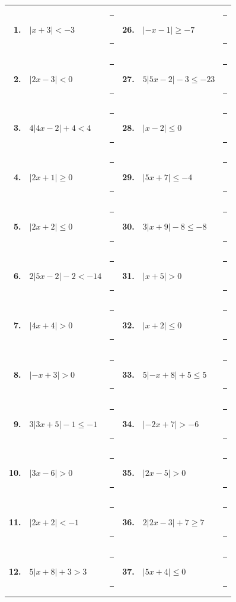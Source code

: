 \documentclass[10pt]{article}
\begin{document}
{\small\begin{tabular}{@{}r@{\ \ }p{4.1cm}p{4.0cm}@{\qquad}r@{\ \ }p{4.1cm}p{4.0cm}@{}}
\textbf{1.} & $\left|x+3\right|<-3$ & \rule{0.6cm}{0.4pt}\ \rule{2.8cm}{0.4pt} & \textbf{26.} & $\left|-x-1\right|\ge-7$ & \rule{0.6cm}{0.4pt}\ \rule{2.8cm}{0.4pt}\\
\textbf{2.} & $\left|2x-3\right|<0$ & \rule{0.6cm}{0.4pt}\ \rule{2.8cm}{0.4pt} & \textbf{27.} & $5\left|5x-2\right|-3\le-23$ & \rule{0.6cm}{0.4pt}\ \rule{2.8cm}{0.4pt}\\
\textbf{3.} & $4\left|4x-2\right|+4<4$ & \rule{0.6cm}{0.4pt}\ \rule{2.8cm}{0.4pt} & \textbf{28.} & $\left|x-2\right|\le0$ & \rule{0.6cm}{0.4pt}\ \rule{2.8cm}{0.4pt}\\
\textbf{4.} & $\left|2x+1\right|\ge0$ & \rule{0.6cm}{0.4pt}\ \rule{2.8cm}{0.4pt} & \textbf{29.} & $\left|5x+7\right|\le-4$ & \rule{0.6cm}{0.4pt}\ \rule{2.8cm}{0.4pt}\\
\textbf{5.} & $\left|2x+2\right|\le0$ & \rule{0.6cm}{0.4pt}\ \rule{2.8cm}{0.4pt} & \textbf{30.} & $3\left|x+9\right|-8\le-8$ & \rule{0.6cm}{0.4pt}\ \rule{2.8cm}{0.4pt}\\
\textbf{6.} & $2\left|5x-2\right|-2<-14$ & \rule{0.6cm}{0.4pt}\ \rule{2.8cm}{0.4pt} & \textbf{31.} & $\left|x+5\right|>0$ & \rule{0.6cm}{0.4pt}\ \rule{2.8cm}{0.4pt}\\
\textbf{7.} & $\left|4x+4\right|>0$ & \rule{0.6cm}{0.4pt}\ \rule{2.8cm}{0.4pt} & \textbf{32.} & $\left|x+2\right|\le0$ & \rule{0.6cm}{0.4pt}\ \rule{2.8cm}{0.4pt}\\
\textbf{8.} & $\left|-x+3\right|>0$ & \rule{0.6cm}{0.4pt}\ \rule{2.8cm}{0.4pt} & \textbf{33.} & $5\left|-x+8\right|+5\le5$ & \rule{0.6cm}{0.4pt}\ \rule{2.8cm}{0.4pt}\\
\textbf{9.} & $3\left|3x+5\right|-1\le-1$ & \rule{0.6cm}{0.4pt}\ \rule{2.8cm}{0.4pt} & \textbf{34.} & $\left|-2x+7\right|>-6$ & \rule{0.6cm}{0.4pt}\ \rule{2.8cm}{0.4pt}\\
\textbf{10.} & $\left|3x-6\right|>0$ & \rule{0.6cm}{0.4pt}\ \rule{2.8cm}{0.4pt} & \textbf{35.} & $\left|2x-5\right|>0$ & \rule{0.6cm}{0.4pt}\ \rule{2.8cm}{0.4pt}\\
\textbf{11.} & $\left|2x+2\right|<-1$ & \rule{0.6cm}{0.4pt}\ \rule{2.8cm}{0.4pt} & \textbf{36.} & $2\left|2x-3\right|+7\ge7$ & \rule{0.6cm}{0.4pt}\ \rule{2.8cm}{0.4pt}\\
\textbf{12.} & $5\left|x+8\right|+3>3$ & \rule{0.6cm}{0.4pt}\ \rule{2.8cm}{0.4pt} & \textbf{37.} & $\left|5x+4\right|\le0$ & \rule{0.6cm}{0.4pt}\ \rule{2.8cm}{0.4pt}\\

\end{tabular}}
\end{document}
